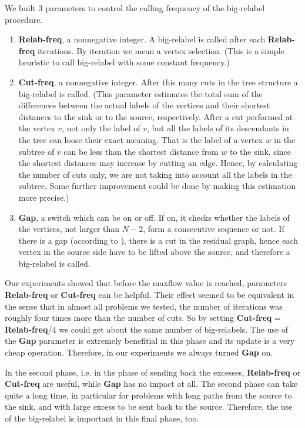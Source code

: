 We built 3 parameters to control the calling frequency of the
big-relabel procedure.
\begin{enumerate}
\item {\bf Relab-freq}, a nonnegative integer. A big-relabel is called
after each {\bf Relab-freq} iterations.	By iteration we mean a vertex
selection. (This is a simple heuristic to call big-relabel with some
constant frequency.) 

\item {\bf Cut-freq}, a nonnegative integer. After this many cuts in
the tree structure a big-relabel is called.	(This parameter estimates
the total sum of the differences between the actual labels of the
vertices and their shortest distances to the sink or to the source,
respectively. After a cut performed at the vertex $v$, not only the
label of $v$, but all the labels of its descendants in the tree can
loose their exact meaning. That is the label of a vertex $w$ in the
subtree of $v$ can be less than the shortest distance from $w$ to the
sink, since the shortest distances may increase by cutting an edge.
Hence, by calculating the number of cuts only, we are not taking into
account all the labels in the subtree. Some further improvement could
be done by making this estimation more precise.) 

\item {\bf Gap}, a switch which can be on or off. If on, it checks
whether the labels of the vertices, not larger than $N-2$, form a
consecutive sequence or not. If there is a gap (according to
\cite{DM}), there is a cut in the residual graph, hence each vertex in
the source side have to be lifted above the source, and therefore a
big-relabel is called. 

\end{enumerate}


Our experiments showed that before the maxflow value is reached,
parameters {\bf Relab-freq} or {\bf Cut-freq} can be helpful. Their
effect seemed to be equivalent in the sense that in almost all problems
we tested, the number of iterations was roughly four times more than
the number of cuts. So by setting {\bf Cut-freq} = {\bf Relab-freq}/4
we could get about the same number of big-relabels.
The use of the {\bf Gap} parameter is extremely benefitial in this
phase  and its update is a very cheap operation. 
Therefore, in our experiments we always turned {\bf Gap} on.

In the second phase, i.e. in the phase of sending back the excesses,
{\bf Relab-freq} or {\bf Cut-freq} are useful, while {\bf Gap} has no
impact at all. The second phase can take quite a long time, in
particular for problems with long paths from the source to the sink,
and with large excess to be sent back to the source.
Therefore, the use of the big-relabel is important in this final phase,
too.

